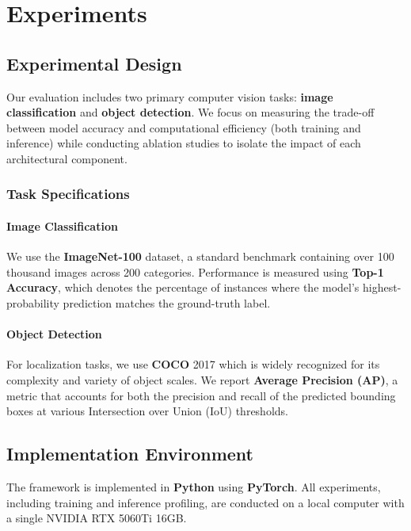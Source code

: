 \section{Experiments}


\subsection{Experimental Design}

Our evaluation includes two primary computer vision tasks: \textbf{image classification} and \textbf{object detection}. We focus on measuring the trade-off between model accuracy and computational efficiency (both training and inference) while conducting ablation studies to isolate the impact of each architectural component.

\subsubsection{Task Specifications}

\paragraph{Image Classification}
We use the \textbf{ImageNet-100} dataset, a standard benchmark containing over 100 thousand images across 200 categories. Performance is measured using \textbf{Top-1 Accuracy}, which denotes the percentage of instances where the model's highest-probability prediction matches the ground-truth label.

\paragraph{Object Detection}
For localization tasks, we use \textbf{COCO} 2017 which is widely recognized for its complexity and variety of object scales. We report \textbf{Average Precision (AP)}, a metric that accounts for both the precision and recall of the predicted bounding boxes at various Intersection over Union (IoU) thresholds.

\subsection{Implementation Environment}
The framework is implemented in \textbf{Python} using \textbf{PyTorch}. All experiments, including training and inference profiling, are conducted on a local computer with a single NVIDIA RTX 5060Ti 16GB.

